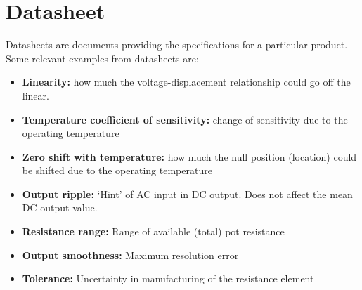 \section{Datasheet}
Datasheets are documents providing the specifications for a particular product. Some relevant examples from datasheets are:
\begin{itemize}
  \item \textbf{Linearity:} how much the voltage-displacement relationship could go off the linear.
  \item \textbf{Temperature coefficient of sensitivity:} change of sensitivity due to the operating temperature
  \item \textbf{Zero shift with temperature:} how much the null position (location) could be shifted due to the operating temperature
  \item \textbf{Output ripple:} ‘Hint’ of AC input in DC output. Does not affect the mean DC output value.
  \item \textbf{Resistance range:} Range of available (total) pot resistance
  \item \textbf{Output smoothness:} Maximum resolution error
  \item \textbf{Tolerance:} Uncertainty in manufacturing of the resistance element
\end{itemize}